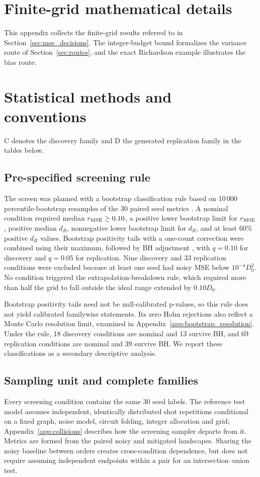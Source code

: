 \section{Finite-grid mathematical details}\label{app:mathematics}
This appendix collects the finite-grid results referred to in Section~\ref{sec:mse_decisions}. The integer-budget bound formalizes the variance route of Section~\ref{sec:routes}, and the exact Richardson example illustrates the bias route.



\section{Statistical methods and conventions}\label{app:statistics}
C denotes the discovery family and D the generated replication family in the tables below.
\subsection{Pre-specified screening rule}
The screen was planned with a bootstrap classification rule based on 10\,000 percentile-bootstrap resamples of the 30 paired seed metrics \citep{EfronTibshirani1993}. A nominal condition required median $r_{\operatorname{MSE}}\ge0.10$, a positive lower bootstrap limit for $r_{\operatorname{MSE}}$, positive median $d_R$, nonnegative lower bootstrap limit for $d_R$, and at least 60\% positive $d_R$ values. Bootstrap positivity tails with a one-count correction were combined using their maximum, followed by BH adjustment \citep{BenjaminiHochberg1995}, with $q=0.10$ for discovery and $q=0.05$ for replication. Nine discovery and 33 replication conditions were excluded because at least one seed had noisy MSE below $10^{-4}D_0^2$. No condition triggered the extrapolation-breakdown rule, which required more than half the grid to fall outside the ideal range extended by $0.10D_0$.

Bootstrap positivity tails need not be null-calibrated p-values, so this rule does not yield calibrated familywise statements. Its zero Holm rejections also reflect a Monte Carlo resolution limit, examined in Appendix~\ref{app:bootstrap_resolution}. Under the rule, 18 discovery conditions are nominal and 13 survive BH, and 69 replication conditions are nominal and 39 survive BH. We report these classifications as a secondary descriptive analysis.

\subsection{Sampling unit and complete families}
Every screening condition contains the same 30 seed labels. The reference test model assumes independent, identically distributed shot repetitions conditional on a fixed graph, noise model, circuit folding, integer allocation and grid; Appendix~\ref{app:collisions} describes how the screening sampler departs from it. Metrics are formed from the paired noisy and mitigated landscapes. Sharing the noisy baseline between orders creates cross-condition dependence, but does not require assuming independent endpoints within a pair for an intersection--union test.


